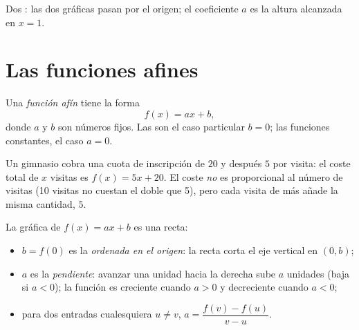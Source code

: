 \begin{omfigure}

{\small Dos : las dos gráficas pasan por el origen; el
coeficiente $a$ es la altura alcanzada en $x = 1$.}
\end{omfigure}

\section{Las funciones afines}

\begin{definition}\label{def:g9:linfunc:affine}
Una \emph{función afín} tiene la forma
\[
f(x) = a x + b ,
\]
donde $a$ y $b$ son números fijos. Las  son el caso
particular $b = 0$; las funciones constantes, el caso $a = 0$.
\end{definition}

\begin{example}
Un gimnasio cobra una cuota de inscripción de $20$ y después $5$ por visita: el coste
total de $x$ visitas es $f(x) = 5x + 20$. El coste \emph{no} es
proporcional al número de visitas (10 visitas no cuestan el doble
que 5), pero cada visita de más añade la misma cantidad, $5$.
\end{example}

\begin{proposition}\label{prop:g9:linfunc:affinegraph}
La gráfica de $f(x) = ax + b$ es una recta:
\begin{itemize}
  \item $b = f(0)$ es la \emph{ordenada en el origen}: la recta corta el
        eje vertical en $(0, b)$;
  \item $a$ es la \emph{pendiente}: avanzar una unidad hacia la
        derecha sube $a$ unidades (baja si $a < 0$); la función es
        creciente cuando $a > 0$ y decreciente cuando $a < 0$;
  \item para dos entradas cualesquiera $u \neq v$,
        $a = \dfrac{f(v) - f(u)}{v - u}$.
\end{itemize}
\end{proposition}

